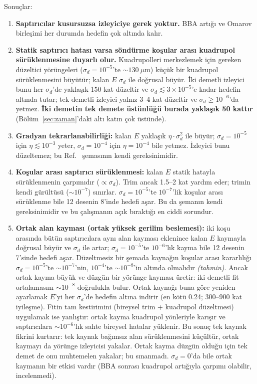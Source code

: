 \documentclass[11pt,a4paper]{article}
\newcommand{\tahmin}{\textit{(tahmin)}}
\begin{document}
Sonuçlar:
\begin{enumerate}
\item \textbf{Saptırıcılar kusursuzsa izleyiciye gerek yoktur.} BBA artığı ve Omarov birleşimi her durumda
hedefin çok altında kalır.
\item \textbf{Statik saptırıcı hatası varsa söndürme koşular arası kuadrupol sürüklenmesine duyarlı olur.}
Kuadrupolleri merkezlemek için gereken düzeltici yörüngeleri ($\sigma_d=10^{-5}$'te $\sim130~\mu$m) küçük bir
kuadrupol sürüklenmesini büyütür; kalan $E$ $\sigma_d$ ile doğrusal büyür. İki demetli izleyici bunu her
$\sigma_d$'de yaklaşık 150 kat düzeltir ve $\sigma_d\lesssim3\times10^{-5}$'e kadar hedefin altında tutar; tek
demetli izleyici yalnız 3--4 kat düzeltir ve $\sigma_d\ge10^{-6}$'da yetmez. \textbf{İki demetin tek demete
üstünlüğü burada yaklaşık 50 kattır} (Bölüm~\ref{sec:zaman}'daki altı katın çok üstünde).
\item \textbf{Gradyan tekrarlanabilirliği:} kalan $E$ yaklaşık $\eta\cdot\sigma_d^2$ ile büyür; $\sigma_d=10^{-5}$
için $\eta\lesssim10^{-3}$ yeter, $\sigma_d=10^{-4}$ için $\eta=10^{-4}$ bile yetmez. İzleyici bunu düzeltemez; bu
Ref.~\cite{omarov} şemasının kendi gereksinimidir.
\item \textbf{Koşular arası saptırıcı sürüklenmesi:} kalan $E$ statik hatayla sürüklenmenin çarpımıdır
($\propto\sigma_d$). Trim ancak 1.5--2 kat yardım eder; trimin kendi gürültüsü ($\sim10^{-7}$) sınırlar.
$\sigma_d=10^{-5}$'te $10^{-7}$'lik koşular arası sürüklenme bile 12 desenin 8'inde hedefi aşar. Bu da şemanın
kendi gereksinimidir ve bu çalışmanın açık bıraktığı en ciddi sorundur.
\item \textbf{Ortak alan kayması (ortak yüksek gerilim beslemesi):} iki koşu arasında bütün saptırıcılara aynı
alan kayması eklenince kalan $E$ kaymayla doğrusal büyür ve $\sigma_d$ ile artar; $\sigma_d=10^{-5}$'te $10^{-6}$'lık
kayma bile 12 desenin 7'sinde hedefi aşar. Düzeltmesiz bir şemada kaynağın koşular arası kararlılığı
$\sigma_d=10^{-5}$'te $\sim10^{-7}$'nin, $10^{-4}$'te $\sim10^{-8}$'in altında olmalıdır \tahmin. Ancak ortak kayma
büyük ve düzgün bir yörünge kayması üretir: iki demetli fit ortalamasını $\sim10^{-8}$ doğrulukla bulur. Ortak
kaynağı buna göre yeniden ayarlamak $E$'yi her $\sigma_d$'de hedefin altına indirir (en kötü 0.24; 300--900 kat
iyileşme). Fitin tam kestirimini (bireysel trim + kuadrupol düzeltmesi) uygulamak ise yanlıştır: ortak kayma
kuadrupol yönleriyle karışır ve saptırıcılara $\sim10^{-6}$'lık sahte bireysel hatalar yüklenir. Bu sonuç tek
kaynak fikrini kurtarır: tek kaynak bağımsız alan sürüklenmesini küçültür, ortak kaymayı da yörünge izleyicisi
yakalar. Ortak kayma düzgün olduğu için tek demet de onu muhtemelen yakalar; bu sınanmadı. $\sigma_d=0$'da bile
ortak kaymanın bir etkisi vardır (BBA sonrası kuadrupol artığıyla çarpımı olabilir, incelenmedi).
\end{enumerate}
\end{document}
